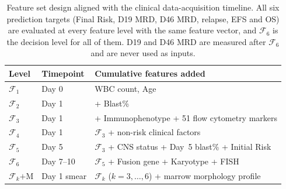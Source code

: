 \documentclass[pdflatex,sn-nature]{sn-jnl}
\begin{document}
\begin{appendices}
\begin{table}[ht]
\caption{Feature set design aligned with the clinical data-acquisition
timeline. All six prediction targets (Final Risk, D19 MRD, D46 MRD,
relapse, EFS and OS) are evaluated at every feature level with the same
feature vector, and $\mathcal{F}_6$ is the decision level for all of them.
D19 and D46 MRD are measured after $\mathcal{F}_6$ and are never used
as inputs.}
\label{tab:expdesign}
\centering
\small
\begin{tabular}{ll>{\raggedright\arraybackslash}p{7.0cm}}
\toprule
\textbf{Level} & \textbf{Timepoint} & \textbf{Cumulative features added} \\
\midrule
$\mathcal{F}_1$     & Day 0     & WBC count, Age \\
$\mathcal{F}_2$     & Day 1     & + Blast\% \\
$\mathcal{F}_3$     & Day 1     & + Immunophenotype + 51 flow cytometry markers \\
$\mathcal{F}_4$     & Day 1     & $\mathcal{F}_3$ + non-risk clinical factors \\
$\mathcal{F}_5$     & Day 5     & $\mathcal{F}_3$ + CNS status + Day~5 blast\% + Initial Risk \\
$\mathcal{F}_6$     & Day 7--10 & $\mathcal{F}_5$ + Fusion gene + Karyotype + FISH \\
$\mathcal{F}_k$$+$M & Day 1 smear & $\mathcal{F}_k$ ($k=3,\dots,6$) + marrow morphology profile \\
\bottomrule
\end{tabular}
\end{table}

\clearpage


\end{appendices}
\end{document}
